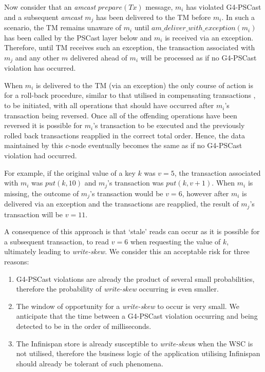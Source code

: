     Now consider that an \emph{amcast} $prepare(Tx)$ message, $m_i$ has violated G4-PSCast and a subsequent \emph{amcast} $m_j$ has been delivered to the TM before $m_i$.  In such a scenario, the TM remains unaware of $m_i$ until $am\_deliver\_with\_exception(m_i)$ has been called by the \textsf{PSCast} layer below and $m_i$ is received via an exception.  Therefore, until TM receives such an exception, the transaction associated with $m_j$ and any other $m$ delivered ahead of $m_i$ will be processed as if no G4-PSCast violation has occurred.  
    
    When $m_i$ is delivered to the TM (via an exception) the only course of action is for a roll-back procedure, similar to that utilised in compensating transactions \citep{Korth:1990:FAR:645916.671971}, to be initiated, with all operations that should have occurred after $m_i$'s transaction being reversed.  Once all of the offending operations have been reversed it is possible for $m_i$'s transaction to be executed and the previously rolled back transactions reapplied in the correct total order.  Hence, the data maintained by this $c$-node eventually becomes the same as if no G4-PSCast violation had occurred.  
    
    For example, if the original value of a key $k$ was $v=5$, the transaction associated with $m_i$ was $put(k, 10)$ and $m_j$'s transaction was $put(k, v+1)$.  When $m_i$ is missing, the outcome of $m_j$'s transaction would be $v = 6$, however after $m_i$ is delivered via an exception and the transactions are reapplied, the result of $m_j$'s transaction will be $v = 11$.  
    
    A consequence of this approach is that \textquoteleft{}stale' reads can occur as it is possible for a subsequent transaction, to read $v = 6$ when requesting the value of $k$, ultimately leading to \emph{write-skew}.  We consider this an acceptable risk for three reasons: 
    \begin{enumerate}[label=\roman*]
        \item    G4-PSCast violations are already the product of several small probabilities, therefore the probability of \emph{write-skew} occurring is even smaller.  
        
        \item    The window of opportunity for a \emph{write-skew} to occur is very small.  We anticipate that the time between a G4-PSCast violation occurring and being detected to be in the order of milliseconds.   
        
        \item    The Infinispan store is already susceptible to \emph{write-skew}s when the WSC is not utilised, therefore the business logic of the application utilising Infinispan should already be tolerant of such phenomena.  
    \end{enumerate}
    
